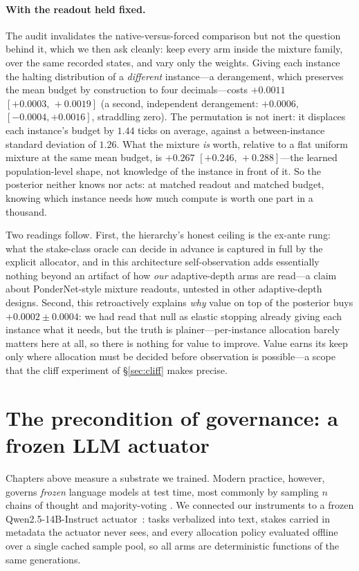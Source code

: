 \documentclass{article}
\newcommand{\VGBcero}{$+0.0002\pm0.0004$}
\newcommand{\Rasign}{$+0.0011$} \newcommand{\RasignIC}{$[+0.0003,\,+0.0019]$}
\newcommand{\Rforma}{$+0.267$} \newcommand{\RformaIC}{$[+0.246,\,+0.288]$}
\newcommand{\Rdesplaz}{$1.44$}
\begin{document}
\paragraph{With the readout held fixed.} The audit invalidates the
native-versus-forced comparison but not the question behind it, which we
then ask cleanly: keep every arm inside the mixture family, over the same
recorded states, and vary only the weights. Giving each instance the
halting distribution of a \emph{different} instance---a derangement, which
preserves the mean budget by construction to four decimals---costs
\Rasign{} \RasignIC{} (a second, independent derangement: $+0.0006$,
$[-0.0004,+0.0016]$, straddling zero). The permutation is not inert: it displaces each
instance's budget by \Rdesplaz{} ticks on average, against a
between-instance standard deviation of $1.26$. What the mixture \emph{is}
worth, relative to a flat uniform mixture at the same mean budget, is
\Rforma{} \RformaIC---the learned population-level shape, not knowledge of
the instance in front of it. So the posterior neither knows nor acts: at
matched readout and matched budget, knowing which instance needs how much
compute is worth one part in a thousand.

Two readings follow. First, the hierarchy's honest ceiling is the ex-ante
rung: what the stake-class oracle can decide in advance is captured in full by
the explicit allocator, and in this architecture self-observation adds
essentially nothing beyond an artifact of how \emph{our} adaptive-depth arms
are read---a claim about PonderNet-style mixture readouts, untested in other
adaptive-depth designs. Second, this
retroactively explains \emph{why} value on top of the posterior buys
\VGBcero{}: we had read that null as elastic stopping already giving each
instance what it needs, but the truth is plainer---per-instance allocation
barely matters here at all, so there is nothing for value to improve.
Value earns its keep only where allocation must be
decided before observation is possible---a scope that the cliff experiment
of \S\ref{sec:cliff} makes precise.

\section{The precondition of governance: a frozen LLM actuator}
\label{sec:llm}

Chapters above measure a substrate we trained. Modern practice, however,
governs \emph{frozen} language models at test time, most commonly by sampling
$n$ chains of thought and majority-voting
\citep{wei2022chain,wang2023selfconsistency,brown2024monkeys}. We connected our instruments to
a frozen Qwen2.5-14B-Instruct actuator~\citep{yang2024qwen25}: tasks verbalized
into text, stakes carried in metadata the actuator never sees, and every
allocation policy evaluated offline over a single cached sample pool, so all
arms are deterministic functions of the same generations.
\end{document}
